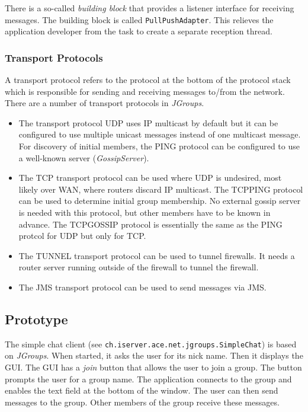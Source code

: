There is a so-called \emph{building block} that provides a listener interface for receiving messages. The building block is called \texttt{PullPushAdapter}. This relieves the application developer from the task to create a separate reception thread. 

\subsubsection{Transport Protocols}
A transport protocol refers to the protocol at the bottom of the protocol stack which is responsible for sending and receiving messages to/from the network. There are a number of transport protocols in \emph{JGroups}.
\begin{itemize}
 \item The transport protocol UDP uses IP multicast by default but it can be configured to use multiple unicast messages instead of one multicast message. For discovery of initial members, the PING protocol can be configured to use a well-known server (\emph{GossipServer}). 
 \item The TCP transport protocol can be used where UDP is undesired, most likely over WAN, where routers discard IP multicast. The TCPPING protocol can be used to determine initial group membership. No external gossip server is needed with this protocol, but other members have to be known in advance. The TCPGOSSIP protocol is essentially the same as the PING protcol for UDP but only for TCP.
 \item The TUNNEL transport protocol can be used to tunnel firewalls. It needs a router server running outside of the firewall to tunnel the firewall.
 \item The JMS transport protocol can be used to send messages via JMS.
\end{itemize}


\subsection{Prototype}
The simple chat client (see \texttt{ch.iserver.ace.net.jgroups.SimpleChat}) is based on \emph{JGroups}. When started, it asks the user for its nick name. Then it displays the GUI. The GUI has a \emph{join} button that allows the user to join a group. The button prompts the user for a group name. The application connects to the group and enables the text field at the bottom of the window. The user can then send messages to the group. Other members of the group receive these messages.

